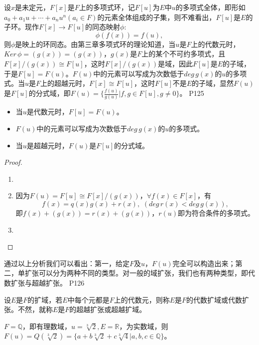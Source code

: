 \original
{
	设$x$是未定元，$F[x]$是$F$上的多项式环，记$F[u]$为$E$中$u$的多项式全体，即形如$a_{0}+a_{1}u+\cdots+a_{n}u^{n}(a_{i}\in F)$的元素全体组成的子集，则不难看出，$F[u]$是$E$的子环。现作$F[x]\rightarrow F[u]$的同态映射$\phi$:
	\begin{equation*}
		\phi(f(x))=f(u),
	\end{equation*}
	则$\phi$是映上的环同态。由第三章多项式环的理论知道，当$u$是$F$上的代数元时，$Ker\,\phi=(g(x))=(g(x))$，$g(x)$是$F$上的某个不可约多项式，且$F[x]/(g(x))\cong F[u]$，这时$F[x]/(g(x))$是域，因此$F[u]$是$E$的子域，于是$F[u]=F(u)$。$F(u)$中的元素可以写成为次数低于$deg\, g(x)$的$u$的多项式。当$u$是$F$上的超越元时，$F[x]\cong F[u]$，这时$F[u]$不是$E$的子域，显然$F(u)$是$F[u]$的分式域，即$F(u)=\{\frac{f(u)}{g(u)}\big| f,g\in F[u],g\neq 0\}$。
}
{P125}

\begin{proposition}
	\begin{itemize}
		\item 当$u$是代数元时，$F[u]=F(u)$。
		\item $F(u)$中的元素可以写成为次数低于$deg\, g(x)$的$u$的多项式。
		\item 当$u$是超越元时，$F(u)$是$F[u]$的分式域。
	\end{itemize}
\end{proposition}

\begin{proof}
	\begin{enumerate}
		\item 
		\item 因为$F(u)=F[u]\cong F[x]/(g(x))$，$\forall f(x)\in F[x]$，有
		\begin{equation*}
			f(x)=q(x)g(x)+r(x),\,\,(deg\,r(x)< deg\, g(x)),
		\end{equation*}
		即$f(x)+(g(x))=r(x)+(g(x))$，$r(u)$即为符合条件的多项式。
		\item 
	\end{enumerate}
\end{proof}

\original
{
	通过以上分析我们可以看出：第一，给定$F$及$u$，$F(u)$完全可以构造出来；第二，单扩张可以分为两种不同的类型。对一般的域扩张，我们也有两种类型，即代数扩张与超越扩张。
}
{P126}
\begin{definition}
	设$E$是$F$的扩域，若$E$中每个元都是$F$上的代数元，则称$E$是$F$的代数扩域或代数扩张。不然，就称$E$是$F$的超越扩张或超越扩域。
\end{definition}

\begin{example}
	$F=\mathbb{Q}$，即有理数域，$u=\sqrt[3]{2},E=\mathbb{R}$，为实数域，则$F(u)=Q(\sqrt[3]{2})=\{a+b\sqrt[3]{2}+c\sqrt[3]{4}\big| a,b,c\in \mathbb{Q}\}$。
\end{example}

